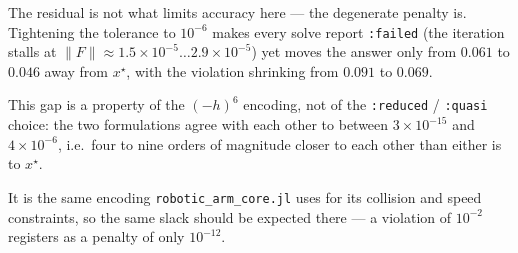\documentclass[11pt]{article}
\begin{document}
The residual is not what limits accuracy here --- the degenerate penalty is. Tightening the
tolerance to \(10^{-6}\) makes every solve report \texttt{:failed} (the iteration stalls at
\(\lVert F\rVert \approx 1.5\times 10^{-5} \dots 2.9\times 10^{-5}\)) yet moves the answer
only from \(0.061\) to \(0.046\) away from \(x^\star\), with the violation shrinking from
\(0.091\) to \(0.069\).

This gap is a property of the \((-h)^6\) encoding, not of the \texttt{:reduced} /
\texttt{:quasi} choice: the two formulations agree with each other to between
\(3\times 10^{-15}\) and \(4\times 10^{-6}\), i.e.\ four to nine orders of magnitude closer to
each other than either is to \(x^\star\).

It is the same encoding \texttt{robotic\_arm\_core.jl} uses for its collision and speed
constraints, so the same slack should be expected there --- a violation of \(10^{-2}\)
registers as a penalty of only \(10^{-12}\).
\end{document}
